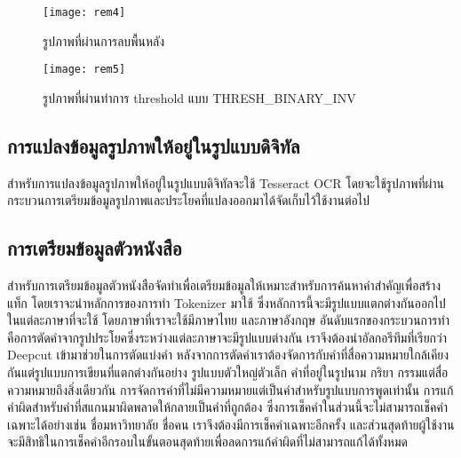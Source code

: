 \begin{figure}[H]
    \centering
    \texttt{[image: rem4]}
    \caption{รูปภาพที่ผ่านการลบพื้นหลัง}\label{fig:rem4}
\end{figure}

\begin{figure}[H]
    \centering
    \texttt{[image: rem5]}
    \caption{รูปภาพที่ผ่านทำการ threshold แบบ THRESH\_BINARY\_INV}\label{fig:rem5}
\end{figure}


\subsection{การแปลงข้อมูลรูปภาพให้อยู่ในรูปแบบดิจิทัล}

สำหรับการแปลงข้อมูลรูปภาพให้อยู่ในรูปแบบดิจิทัลจะใช้ Tesseract OCR โดยจะใช้รูปภาพที่ผ่านกระบวนการเตรียมข้อมูลรูปภาพและประโยคที่แปลงออกมาได้จัดเก็บไว้ใช้งานต่อไป

\subsection{การเตรียมข้อมูลตัวหนังสือ}

สำหรับการเตรียมข้อมูลตัวหนังสือจัดทำเพื่อเตรียมข้อมูลให้เหมาะสำหรับการค้นหาคำสำคัญเพื่อสร้างแท็ก โดยเราจะนำหลักการของการทำ Tokenizer มาใช้ ซึ่งหลักการนี้จะมีรูปแบบแตกต่างกันออกไปในแต่ละภาษาที่จะใช้ โดยภาษาที่เราจะใช้มีภาษาไทย และภาษาอังกฤษ อันดับแรกของกระบวนการทำคือการตัดคำจากรูปประโยคซึ่งระหว่างแต่ละภาษาจะมีรูปแบบต่างกัน เราจึงต้องนำอัลกอรึทึมที่เรียกว่า Deepcut เข้ามาช่วยในการตัดแบ่งคำ หลังจากการตัดคำเราต้องจัดการกับคำที่สื่อความหมายใกล้เคียงกันแต่รูปแบบการเขียนที่แตกต่างกันอย่าง รูปแบบตัวใหญ่ตัวเล็ก คำที่อยู่ในรูปนาม กริยา กรรมแต่สื่อความหมายถึงสิ่งเดียวกัน การจัดการคำที่ไม่มีความหมายแต่เป็นคำสำหรับรูปแบบการพูดเท่านั้น การแก้คำผิดสำหรับคำที่สแกนมาผิดพลาดให้กลายเป็นคำที่ถูกต้อง ซึ่งการเช็คคำในส่วนนี้จะไม่สามารถเช็คคำเฉพาะได้อย่างเช่น ชื่อมหาวิทยาลัย ชื่อคน เราจึงต้องมีการเช็คคำเฉพาะอีกครั้ง และส่วนสุดท้ายผู้ใช้งานจะมีสิทธิในการเช็คคำอีกรอบในขั้นตอนสุดท้ายเพื่อลดการแก้คำผิดที่ไม่สามารถแก้ได้ทั้งหมด

